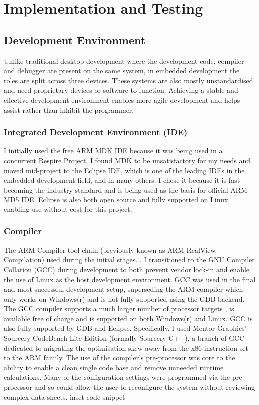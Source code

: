 
\chapter{Implementation and Testing}

\section{Development Environment}
Unlike traditional desktop development where the development code, compiler
and debugger are present on the same system, in embedded development the
roles are split across three devices. These systems are also mostly unstandardised
and need proprietary devices or software to function. Achieving a stable and
effective development environment enables more agile development and
helps assist rather than inhibit the programmer.

\subsection{Integrated Development Environment (IDE)}
I initially used the free ARM MDK IDE because it was being used in a concurrent Respire Project. I
found MDK to be unsatisfactory for my needs and moved mid-project to the Eclipse IDE, which is
one of the leading IDEs in the embedded development field, and in many others. I chose it because it
is fast becoming the industry standard and is being used as the basis for official ARM MD5 IDE.
Eclipse is also both open source and fully supported on Linux, enabling use without cost for this
project.

\subsection{Compiler}
The ARM Compiler tool chain (previously known as ARM RealView Compilation) used during the
initial stages. . I transitioned to the GNU Compiler Collation (GCC) during development to both
prevent vendor lock-in and enable the use of Linux as the host development environment. GCC was
used in the final and most successful development setup, superseding the ARM compiler which only
works on Windows(r) and is not fully supported using the GDB backend. The GCC compiler supports
a much larger number of processor targets , is available free of charge and is supported on both
Windows(r) and Linux. GCC is also fully supported by GDB and Eclipse. Specifically, I used Mentor
Graphics’ Sourcery CodeBench Lite Edition (formally Sourcery G++), a branch of GCC dedicated to
migrating the optimisation skew away from the x86 instruction set to the ARM family.
The use of the compiler’s pre-processor was core to the ability to enable a clean single code base
and remove unneeded runtime calculations. Many of the configuration settings were programmed
via the pre-processor and so could allow the user to reconfigure the system without reviewing
complex data sheets.
{inset code snippet}


